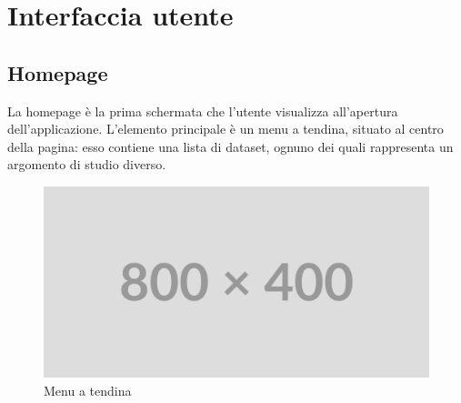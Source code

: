 \section{Interfaccia utente}

\subsection{Homepage}
La homepage è la prima schermata che l'utente visualizza all'apertura
dell'applicazione. L'elemento principale è un menu a tendina, situato al centro
della pagina: esso contiene una lista di dataset, ognuno dei quali rappresenta
un argomento di studio diverso.
\begin{figure}[ht!]
    \centering
    \includegraphics[scale=0.6]{template/images/placeholder.png}
    \caption{Menu a tendina}
\end{figure}

